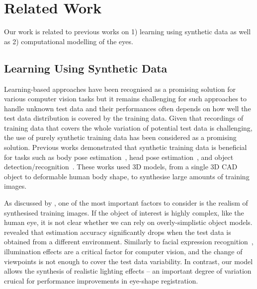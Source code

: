
\section{Related Work}

Our work is related to previous works on 1) learning using synthetic data as well as 2) computational modelling of the eyes.

\subsection{Learning Using Synthetic Data}

Learning-based approaches have been recognised as a promising solution for various computer vision tasks
but it remains challenging for such approaches to handle unknown test data and their performances often depends on how well the test data distribution is covered by the training data.
Given that recordings of training data that covers the whole variation of potential test data is challenging,
the use of purely synthetic training data has been considered as a promising solution.
Previous works demonstrated that synthetic training data is beneficial for tasks such as body pose estimation~\cite{shakhnarovich2003fast,okada2008relevant,shotton2013real}, head pose estimation~\cite{fanelli2011real}, and object detection/recognition~\cite{yu2010improving,liebelt2010multiview,jaderberg2014synthetic}.
These works used 3D models, from a single 3D CAD object to deformable human body shape, to synthesise large amounts of training images.

As discussed by \citet{kaneva2011evaluation}, one of the most important factors to consider is the realism of synthesised training images.
If the object of interest is highly complex, like the human eye, it is not clear whether we can rely on overly-simplistic object models.
\citet{zhang15_cvpr} revealed that estimation accuracy significantly drops when the test data is obtained from a different environment.
Similarly to facial expression recognition~\cite{stratou2011effect}, illumination effects are a critical factor for computer vision, and the change of viewpoints is not enough to cover the test data variability.
In contrast, our model allows the synthesis of realistic lighting effects -- an important degree of variation cruical for performance improvements in eye-shape registration.


